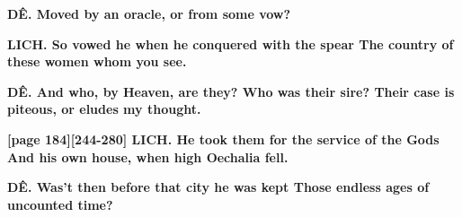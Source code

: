 \documentclass[11pt,letter]{book}
\begin{document}
\par \textbf{DÊ. Moved by an oracle, or from some vow?}
\par 

\par \textbf{LICH. So vowed he when he conquered with the spear The country of these women whom you see.}
\par 

\par \textbf{DÊ. And who, by Heaven, are they? Who was their sire? Their case is piteous, or eludes my thought.}
\par 

\par \textbf{[page 184][244-280] LICH. He took them for the service of the Gods And his own house, when high Oechalia fell.}
\par 

\par \textbf{DÊ. Was’t then before that city he was kept Those endless ages of uncounted time?}
\par 
\end{document}
